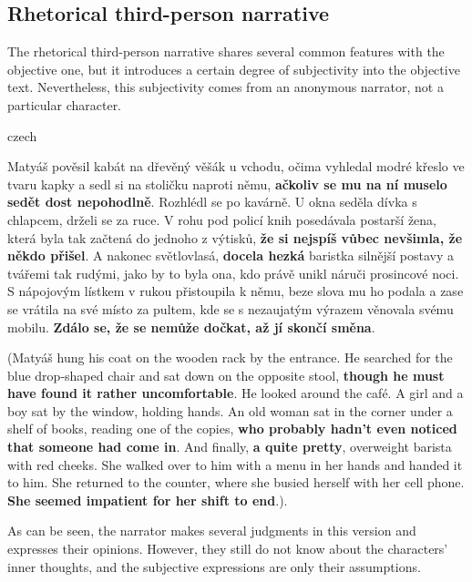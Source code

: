 \subsection{Rhetorical third-person narrative}
The rhetorical third-person narrative shares several common features with the objective one, but it introduces a certain degree of subjectivity into the objective text. Nevertheless, this subjectivity comes from an anonymous narrator, not a particular character. \cite{dolezel-narativni-zpusoby}
\newline

\begin{otherlanguage*}{czech}
\begin{quoting}
Matyáš pověsil kabát na dřevěný věšák u vchodu, očima vyhledal modré křeslo ve tvaru kapky a sedl si na stoličku naproti němu, \textbf{ačkoliv se mu na ní muselo sedět dost nepohodlně}. Rozhlédl se po kavárně. U okna seděla dívka s chlapcem, drželi se za ruce. V rohu pod policí knih posedávala postarší žena, která byla tak začtená do jednoho z výtisků, \textbf{že si nejspíš vůbec nevšimla, že někdo přišel}. A nakonec světlovlasá, \textbf{docela hezká} baristka silnější postavy a tvářemi tak rudými, jako by to byla ona, kdo právě unikl náruči prosincové noci. S nápojovým lístkem v rukou přistoupila k němu, beze slova mu ho podala a zase se vrátila na své místo za pultem, kde se s nezaujatým výrazem věnovala svému mobilu. \textbf{Zdálo se, že se nemůže dočkat, až jí skončí směna}.
\newline
\end{quoting}
\end{otherlanguage*}
\begin{quoting}
(Matyáš hung his coat on the wooden rack by the entrance. He searched for the blue drop-shaped chair and sat down on the opposite stool, \textbf{though he must have found it rather uncomfortable}. He looked around the café. A girl and a boy sat by the window, holding hands. An old woman sat in the corner under a shelf of books, reading one of the copies, \textbf{who probably hadn't even noticed that someone had come in}. And finally, \textbf{a quite pretty}, overweight barista with red cheeks. She walked over to him with a menu in her hands and handed it to him. She returned to the counter, where she busied herself with her cell phone. \textbf{She seemed impatient for her shift to end}.).
\newline
\end{quoting}

As can be seen, the narrator makes several judgments in this version and expresses their opinions. However, they still do not know about the characters' inner thoughts, and the subjective expressions are only their assumptions.

